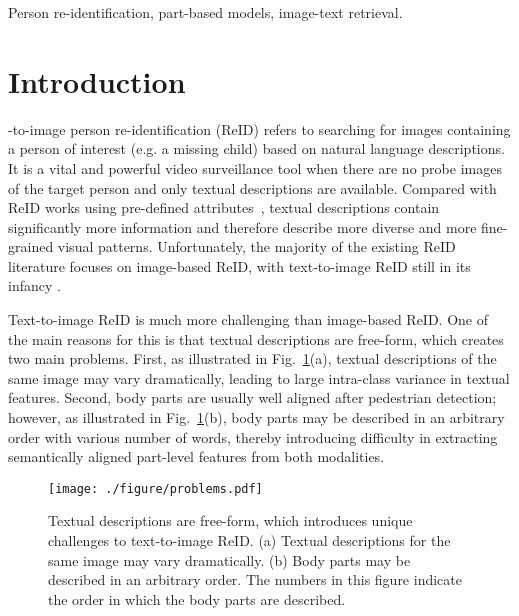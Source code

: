 \documentclass[journal]{IEEEtran}
\begin{document}
\begin{IEEEkeywords}
Person re-identification, part-based models, image-text retrieval.
\end{IEEEkeywords}






\IEEEpeerreviewmaketitle


\section{Introduction}
-to-image person re-identification (ReID) refers to searching for images containing a person of interest (e.g. a missing child) based on natural language descriptions. It is a vital and powerful video surveillance tool when there are no probe images of the target person and only textual descriptions are available.
Compared with ReID works using pre-defined attributes~\cite{yang2020hierarchical, liu2018sequence, sarafianos2018deep},
textual descriptions contain significantly more information and therefore describe more diverse and more fine-grained visual patterns.
Unfortunately, the majority of the existing ReID literature focuses on image-based ReID, with text-to-image ReID still in its infancy \cite{wang2019beyond,leng2019survey}.

Text-to-image ReID is much more challenging than image-based ReID. One of the main reasons for this is that textual descriptions are free-form, which creates two main problems. First, as illustrated in Fig.~\ref{fig:problems}(a), textual descriptions of the same image may vary dramatically, leading to large intra-class variance in textual features.
Second, body parts are usually well aligned after pedestrian detection; however, as illustrated in Fig.~\ref{fig:problems}(b), body parts may be described in an arbitrary order with various number of words, thereby introducing difficulty in extracting semantically aligned part-level features from both modalities.

\begin{figure}[t]
\begin{center}
\texttt{[image: ./figure/problems.pdf]}
\end{center}
   \caption{Textual descriptions are free-form, which introduces unique challenges to text-to-image ReID. (a) Textual descriptions for the same image may vary dramatically. (b) Body parts may be described in an arbitrary order. The numbers in this figure indicate the order in which the body parts are described.}
\label{fig:problems}
\end{figure}
\end{document}
